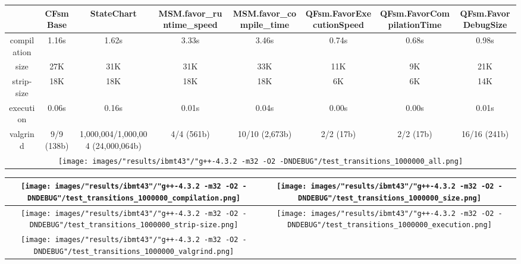\begin{landscape}
\begin{table}
\caption{"ibmt43" [df6407d], g++-4.3.2 -m32 -O2 -DNDEBUG/test transitions 1000000}
\centering
\begin{longtable}{| c | c |c |c |c |c |c |c |}
\hline
& CFsmBase& StateChart& MSM.favor\_runtime\_speed& MSM.favor\_compile\_time& QFsm.FavorExecutionSpeed& QFsm.FavorCompilationTime& QFsm.FavorDebugSize\\
\hline
compilation & 1.16s & 1.62s & 3.33s & 3.46s & 0.74s & 0.68s & 0.98s\\
\hline
size & 27K & 31K & 31K & 33K & 11K & 9K & 21K\\
\hline
strip-size & 18K & 18K & 18K & 18K & 6K & 6K & 14K\\
\hline
execution & 0.06s & 0.16s & 0.01s & 0.04s & 0.00s & 0.00s & 0.01s\\
\hline
valgrind & 9/9 (138b) & 1,000,004/1,000,004 (24,000,064b) & 4/4 (561b) & 10/10 (2,673b) & 2/2 (17b) & 2/2 (17b) & 16/16 (241b)\\
\hline
\multicolumn{8}{|c|}{\texttt{[image: images/"results/ibmt43"/"g++-4.3.2 -m32 -O2 -DNDEBUG"/test\_transitions\_1000000\_all.png]}}\\
\hline
\end{longtable}
\end{table}
\end{landscape}
\newpage
\begin{table}
\centering
\begin{longtable}{| c | c |}
\hline
\texttt{[image: images/"results/ibmt43"/"g++-4.3.2 -m32 -O2 -DNDEBUG"/test\_transitions\_1000000\_compilation.png]}& \texttt{[image: images/"results/ibmt43"/"g++-4.3.2 -m32 -O2 -DNDEBUG"/test\_transitions\_1000000\_size.png]}\\
\hline
\texttt{[image: images/"results/ibmt43"/"g++-4.3.2 -m32 -O2 -DNDEBUG"/test\_transitions\_1000000\_strip-size.png]}& \texttt{[image: images/"results/ibmt43"/"g++-4.3.2 -m32 -O2 -DNDEBUG"/test\_transitions\_1000000\_execution.png]}\\
\hline
\texttt{[image: images/"results/ibmt43"/"g++-4.3.2 -m32 -O2 -DNDEBUG"/test\_transitions\_1000000\_valgrind.png]}& \\ \hline
\end{longtable}
\end{table}
